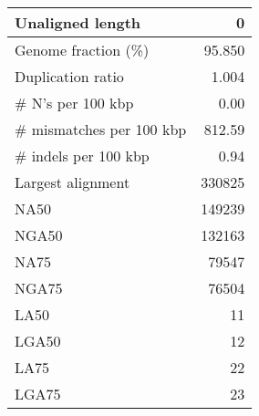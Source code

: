 \documentclass[12pt,a4paper]{article}
\begin{document}
\begin{table}[ht]
\begin{center}
\begin{tabular}{|l*{1}{|r}|}
Unaligned length & 0 \\ \hline
Genome fraction (\%) & 95.850 \\ \hline
Duplication ratio & 1.004 \\ \hline
\# N's per 100 kbp & 0.00 \\ \hline
\# mismatches per 100 kbp & 812.59 \\ \hline
\# indels per 100 kbp & 0.94 \\ \hline
Largest alignment & 330825 \\ \hline
NA50 & 149239 \\ \hline
NGA50 & 132163 \\ \hline
NA75 & 79547 \\ \hline
NGA75 & 76504 \\ \hline
LA50 & 11 \\ \hline
LGA50 & 12 \\ \hline
LA75 & 22 \\ \hline
LGA75 & 23 \\ \hline
\end{tabular}
\end{center}
\end{table}
\end{document}
